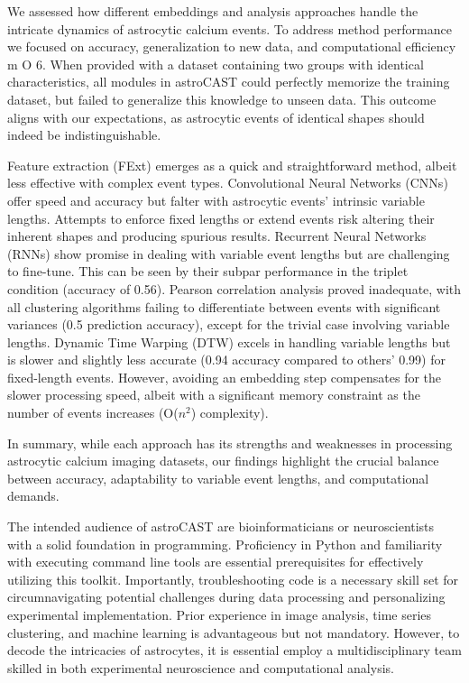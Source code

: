 \documentclass[utf8]{FrontiersinHarvard}
\newcommand{\fref}{ m O{} }{ (Figure~\ref{fig:#1}\IfValueT{#2}{\,#2})}
\begin{document}
    We assessed how different embeddings and analysis approaches handle the intricate dynamics of astrocytic calcium events. To address method performance we focused on accuracy, generalization to new data, and computational efficiency\fref{6}. When provided with a dataset containing two groups with identical characteristics, all modules in astroCAST could perfectly memorize the training dataset, but failed to generalize this knowledge to unseen data. This outcome aligns with our expectations, as astrocytic events of identical shapes should indeed be indistinguishable.

    Feature extraction (FExt) emerges as a quick and straightforward method, albeit less effective with complex event types. Convolutional Neural Networks (CNNs) offer speed and accuracy but falter with astrocytic events' intrinsic variable lengths. Attempts to enforce fixed lengths or extend events risk altering their inherent shapes and producing spurious results. Recurrent Neural Networks (RNNs) show promise in dealing with variable event lengths but are challenging to fine-tune. This can be seen by their subpar performance in the triplet condition (accuracy of 0.56). Pearson correlation analysis proved inadequate, with all clustering algorithms failing to differentiate between events with significant variances (0.5 prediction accuracy), except for the trivial case involving variable lengths. Dynamic Time Warping (DTW) excels in handling variable lengths but is slower and slightly less accurate (0.94 accuracy compared to others' 0.99) for fixed-length events. However, avoiding an embedding step compensates for the slower processing speed, albeit with a significant memory constraint as the number of events increases (O($n^2$) complexity).

    In summary, while each approach has its strengths and weaknesses in processing astrocytic calcium imaging datasets, our findings highlight the crucial balance between accuracy, adaptability to variable event lengths, and computational demands.

    The intended audience of astroCAST are bioinformaticians or neuroscientists with a solid foundation in programming. Proficiency in Python and familiarity with executing command line tools are essential prerequisites for effectively utilizing this toolkit. Importantly, troubleshooting code is a necessary skill set for circumnavigating potential challenges during data processing and personalizing experimental implementation. Prior experience in image analysis, time series clustering, and machine learning is advantageous but not mandatory. However, to decode the intricacies of astrocytes, it is essential employ a multidisciplinary team skilled in both experimental neuroscience and computational analysis.
\end{document}
